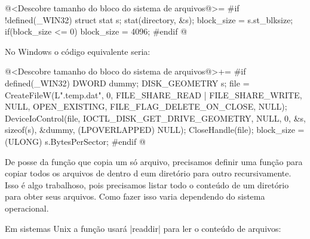 \iniciocodigo
@<Descobre tamanho do bloco do sistema de arquivos@>=
#if !defined(_WIN32)
{
  struct stat s;
  stat(directory, &s);
  block_size = s.st_blksize;
  if(block_size <= 0){
    block_size = 4096;
  }
}
#endif
@
\fimcodigo

No Windows o código equivalente seria:

\iniciocodigo
@<Descobre tamanho do bloco do sistema de arquivos@>+=
#if defined(_WIN32)
{
  DWORD dummy;
  DISK_GEOMETRY s;
  file = CreateFileW(L".temp.dat", 0, FILE_SHARE_READ | FILE_SHARE_WRITE,
                     NULL, OPEN_EXISTING, FILE_FLAG_DELETE_ON_CLOSE, NULL);
  DeviceIoControl(file, IOCTL_DISK_GET_DRIVE_GEOMETRY, NULL, 0, &s,
                  sizeof(s), &dummy, (LPOVERLAPPED) NULL);
  CloseHandle(file);
  block_size = (ULONG) s.BytesPerSector;
}
#endif
@
\fimcodigo


De posse da função que copia um só arquivo, precisamos definir uma
função para copiar todos os arquivos de dentro d eum diretório para
outro recursivamente. Isso é algo trabalhoso, pois precisamos listar
todo o conteúdo de um diretório para obter seus arquivos. Como fazer
isso varia dependendo do sistema operacional.


Em sistemas Unix a função usará |readdir| para ler o conteúdo de
arquivos:

